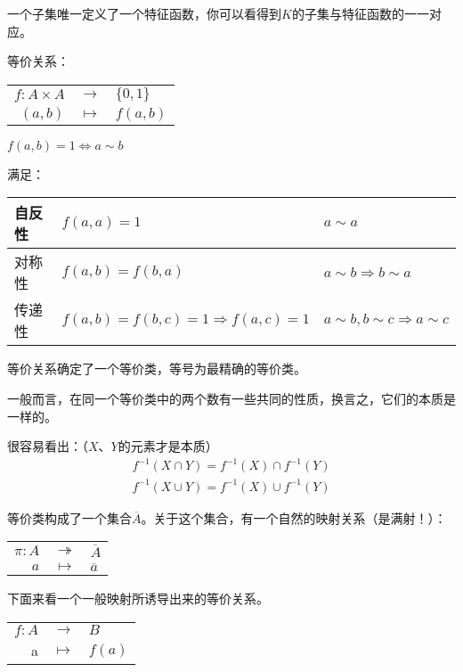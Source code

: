 \documentclass[UTF8]{ctexart}
\begin{document}
一个子集唯一定义了一个特征函数，你可以看得到$K$的子集与特征函数的一一对应。

等价关系：
\begin{center}
    \begin{tabular}{rcl}
    $f:A \times A$&$\rightarrow$&$\{ 0, 1\}$  \\
    $(a,b)$&$\mapsto$&$f(a,b)$\\
    \end{tabular}
\end{center}
\begin{center}
$f(a,b)=1 \Leftrightarrow a \sim b$
\end{center}
满足：
\begin{center}
    \begin{tabular}{|l|l|l|}
    \hline
自反性&$f(a,a)=1$&$a \sim a$\\
\hline
对称性&$f(a,b)=f(b,a)$&$a \sim b\Rightarrow b \sim a$\\
\hline
传递性&$f(a,b)=f(b,c)=1 \Rightarrow f(a,c)=1$&$a \sim b,b \sim c \Rightarrow a \sim c$\\
\hline
    \end{tabular}
\end{center}

等价关系确定了一个等价类，等号为最精确的等价类。

一般而言，在同一个等价类中的两个数有一些共同的性质，换言之，它们的本质是一样的。

很容易看出：（$X$、$Y$的元素才是本质）
\begin{equation}
\begin{split}
f^{-1} (X \cap Y)=f^{-1} (X) \cap f^{-1} (Y)\\
f^{-1} (X \cup Y)=f^{-1} (X) \cup f^{-1} (Y)
\end{split}
\end{equation}

等价类构成了一个集合$\overline{A}$。关于这个集合，有一个自然的映射关系（是满射！）：
\begin{center}
    \begin{tabular}{rcl}
    $\pi:A$&$\twoheadrightarrow$&$\overline{A}$  \\
    $a$&$\mapsto$&$\overline{a}$
    \end{tabular}
\end{center}

下面来看一个一般映射所诱导出来的等价关系。
\begin{center}
    \begin{tabular}{rcl}
    $f:A$&$\rightarrow$&$B$  \\
    a &$\mapsto$&$f(a)$
    \end{tabular}
\end{center}
\end{document}
